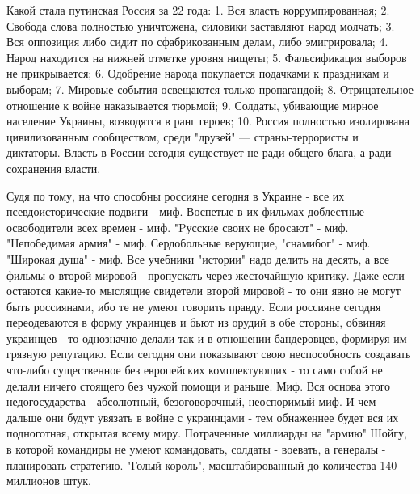 Какой стала путинская Россия за 22 года:
1. Вся власть коррумпированная;
2. Свобода слова полностью уничтожена, силовики заставляют народ молчать;
3. Вся оппозиция либо сидит по сфабрикованным делам, либо эмигрировала;
4. Народ находится на нижней отметке уровня нищеты;
5. Фальсификация выборов не прикрывается;
6. Одобрение народа покупается подачками к праздникам и выборам;
7. Мировые события освещаются только пропагандой;
8. Отрицательное отношение к войне наказывается тюрьмой;
9. Солдаты, убивающие мирное население Украины, возводятся в ранг героев;
10. Россия полностью изолирована цивилизованным сообществом, среди "друзей" — страны-террористы и диктаторы.
Власть в России сегодня существует не ради общего блага, а ради сохранения власти.

Судя по тому, на что способны россияне сегодня в Украине - все их псевдоисторические подвиги - миф.
Воспетые в их фильмах доблестные освободители всех времен - миф.
"Pусские своих не бросают" - миф.
"Непобедимая армия" - миф.
Сердобольные верующие, "снамибог" - миф.
"Широкая душа" - миф.
Все учебники "истории" надо делить на десять, а все фильмы о второй мировой - пропускать через жесточайшую критику. Даже если остаются какие-то мыслящие свидетели второй мировой - то они явно не могут быть россиянами, ибо те не умеют говорить правду.
Если россияне сегодня переодеваются в форму украинцев и бьют из орудий в обе стороны, обвиняя украинцев - то однозначно делали так и в отношении бандеровцев, формируя им грязную репутацию. Если сегодня они показывают свою неспособность создавать что-либо существенное без европейских комплектующих - то само собой не делали ничего стоящего без чужой помощи и раньше.
Миф. Вся основа этого недогосударства - абсолютный, безоговорочный, неоспоримый миф. И чем дальше они будут увязать в войне с украинцами - тем обнаженнее будет вся их подноготная, открытая всему миру. Потраченные миллиарды на "армию" Шойгу, в которой командиры не умеют командовать, солдаты - воевать, а генералы - планировать стратегию.
"Голый король", масштабированный до количества 140 миллионов штук.

